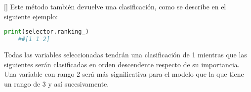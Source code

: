 []
Este método también devuelve una clasificación, como se describe en el siguiente ejemplo:
\begin{lstlisting}[language=Python]
	print(selector.ranking_)
	##[1 1 2]
\end{lstlisting}



\begin{observacion}
	Todas las variables seleccionadas tendrán una clasificación de 1 mientras que las siguientes serán
	clasificadas en orden descendente respecto de su importancia. Una variable con rango 2 será más
	significativa para el modelo que la que tiene un rango de 3 y así sucesivamente.
\end{observacion}


